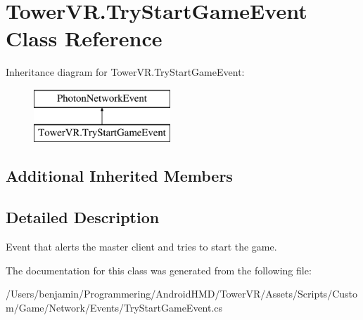 \hypertarget{class_tower_v_r_1_1_try_start_game_event}{}\section{Tower\+V\+R.\+Try\+Start\+Game\+Event Class Reference}
\label{class_tower_v_r_1_1_try_start_game_event}
Inheritance diagram for Tower\+V\+R.\+Try\+Start\+Game\+Event\+:\begin{figure}[H]
\begin{center}
\leavevmode
\includegraphics[height=2.000000cm]{class_tower_v_r_1_1_try_start_game_event}
\end{center}
\end{figure}
\subsection*{Additional Inherited Members}


\subsection{Detailed Description}
Event that alerts the master client and tries to start the game. 

The documentation for this class was generated from the following file\+:\begin{DoxyCompactItemize}
\item 
/\+Users/benjamin/\+Programmering/\+Android\+H\+M\+D/\+Tower\+V\+R/\+Assets/\+Scripts/\+Custom/\+Game/\+Network/\+Events/Try\+Start\+Game\+Event.\+cs\end{DoxyCompactItemize}

